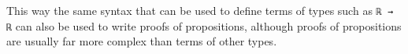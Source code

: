 \documentclass[12pt]{article} %
\theoremstyle{definition}
\theoremstyle{definition}
\theoremstyle{definition}
\theoremstyle{definition}
\begin{document}
This way the same syntax that can be used to define terms of types such as \lstinline{ℝ → ℝ}
can also be used to write proofs of propositions, although proofs of propositions are usually
far more complex than terms of other types.









\end{document}
